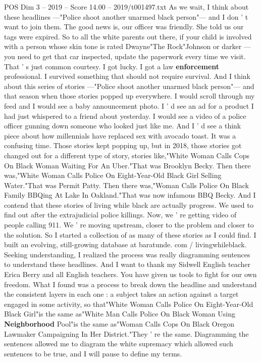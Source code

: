 \begin{textsample}{POS Dim 3 – 2019 – Score 14.00 – 2019/t001497.txt}
As we wait, I think about these headlines —"Police shoot another unarmed black person"— and I don ' t want to join them.
The good news is, our officer was friendly.
She told us our tags were expired.
So to all the white parents out there, if your child is involved with a person whose skin tone is rated Dwayne"The Rock"Johnson or darker — you need to get that car inspected, update the paperwork every time we visit.
That ' s just common courtesy.
I got lucky.
I got a law \textbf{enforcement} professional.
I survived something that should not require survival.
And I think about this series of stories —"Police shoot another unarmed black person"— and that season when those stories popped up everywhere.
I would scroll through my feed and I would see a baby announcement photo.
I ' d see an ad for a product I had just whispered to a friend about yesterday.
I would see a video of a police officer gunning down someone who looked just like me.
And I ' d see a think piece about how millennials have replaced sex with avocado toast.
It was a confusing time.
Those stories kept popping up, but in 2018, those stories got changed out for a different type of story, stories like,"White Woman Calls Cops On Black Woman Waiting For An Uber."That was Brooklyn Becky.
Then there was,"White Woman Calls Police On Eight-Year-Old Black Girl Selling Water."That was Permit Patty.
Then there was,"Woman Calls Police On Black Family BBQing At Lake In Oakland."That was now infamous BBQ Becky.
And I contend that these stories of living while black are actually progress.
We used to find out after the extrajudicial police killings.
Now, we ' re getting video of people calling 911.
We ' re moving upstream, closer to the problem and closer to the solution.
So I started a collection of as many of these stories as I could find.
I built an evolving, still-growing database at baratunde. com / livingwhileblack.
Seeking understanding, I realized the process was really diagramming sentences to understand these headlines.
And I want to thank my Sidwell English teacher Erica Berry and all English teachers.
You have given us tools to fight for our own freedom.
What I found was a process to break down the headline and understand the consistent layers in each one : a subject takes an action against a target engaged in some activity, so that"White Woman Calls Police On Eight-Year-Old Black Girl"is the same as"White Man Calls Police On Black Woman Using \textbf{Neighborhood} Pool"is the same as"Woman Calls Cops On Black Oregon Lawmaker Campaigning In Her District."They ' re the same.
Diagramming the sentences allowed me to diagram the white supremacy which allowed such sentences to be true, and I will pause to define my terms.

\end{textsample}
